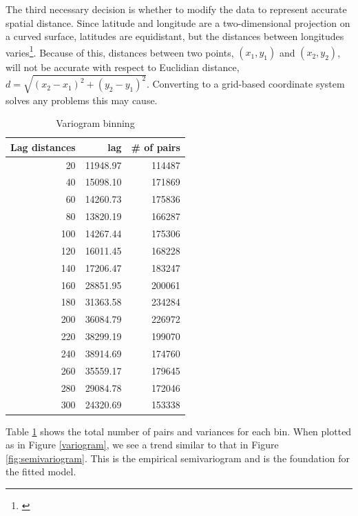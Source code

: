\documentclass[12pt,twoside]{reedthesis}
\begin{document}
The third necessary decision is whether to modify the data to represent accurate spatial distance. Since latitude and longitude are a two-dimensional projection on a curved surface, latitudes are equidistant, but the distances between longitudes varies\footnote{\cite{SpatialEpi}}. Because of this, distances between two points, $(x_1, y_1)$ and $(x_2, y_2)$, will not be accurate with respect to Euclidian distance, $d = \sqrt{(x_2 - x_1)^2 + (y_2 - y_1)^2}$. Converting to a grid-based coordinate system solves any problems this may cause. 


\begin{table}[h]

\centering

\begin{tabular}{r|r|r}
\hline
Lag distances & lag & \# of pairs\\
\hline
20 & 11948.97 & 114487\\
\hline
40 & 15098.10 & 171869\\
\hline
60 & 14260.73 & 175836\\
\hline
80 & 13820.19 & 166287\\
\hline
100 & 14267.44 & 175306\\
\hline
120 & 16011.45 & 168228\\
\hline
140 & 17206.47 & 183247\\
\hline
160 & 28851.95 & 200061\\
\hline
180 & 31363.58 & 234284\\
\hline
200 & 36084.79 & 226972\\
\hline
220 & 38299.19 & 199070\\
\hline
240 & 38914.69 & 174760\\
\hline
260 & 35559.17 & 179645\\
\hline
280 & 29084.78 & 172046\\
\hline
300 & 24320.69 & 153338\\
\hline
\end{tabular}

\caption{Variogram binning}
\label{bins}

\end{table}

Table \ref{bins} shows the total number of pairs and variances for each bin. When plotted as in Figure \ref{variogram}, we see a trend similar to that in Figure \ref{fig:semivariogram}. This is the empirical semivariogram and is the foundation for the fitted model.
	
\end{document}
